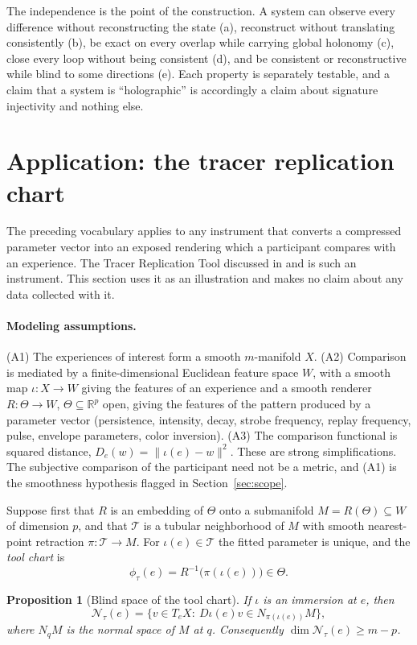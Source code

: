 \documentclass[11pt]{article}
\newtheorem{proposition}{Proposition}
\theoremstyle{remark}
\newcommand{\R}{\mathbb{R}}
\newcommand{\N}{\mathcal{N}}
\begin{document}
The independence is the point of the construction. A system can observe every difference without reconstructing the state (a), reconstruct without translating consistently (b), be exact on every overlap while carrying global holonomy (c), close every loop without being consistent (d), and be consistent or reconstructive while blind to some directions (e). Each property is separately testable, and a claim that a system is ``holographic'' is accordingly a claim about signature injectivity and nothing else.

\section{Application: the tracer replication chart}

The preceding vocabulary applies to any instrument that converts a compressed parameter vector into an exposed rendering which a participant compares with an experience. The Tracer Replication Tool discussed in \cite{flyxion} and \cite{qri_note} is such an instrument. This section uses it as an illustration and makes no claim about any data collected with it.

\paragraph{Modeling assumptions.} (A1) The experiences of interest form a smooth $m$-manifold $X$. (A2) Comparison is mediated by a finite-dimensional Euclidean feature space $W$, with a smooth map $\iota:X\to W$ giving the features of an experience and a smooth renderer $R:\Theta\to W$, $\Theta\subseteq\R^p$ open, giving the features of the pattern produced by a parameter vector (persistence, intensity, decay, strobe frequency, replay frequency, pulse, envelope parameters, color inversion). (A3) The comparison functional is squared distance, $D_e(w)=\|\iota(e)-w\|^2$. These are strong simplifications. The subjective comparison of the participant need not be a metric, and (A1) is the smoothness hypothesis flagged in Section~\ref{sec:scope}.

Suppose first that $R$ is an embedding of $\Theta$ onto a submanifold $M=R(\Theta)\subseteq W$ of dimension $p$, and that $\mathcal T$ is a tubular neighborhood of $M$ with smooth nearest-point retraction $\pi:\mathcal T\to M$. For $\iota(e)\in\mathcal T$ the fitted parameter is unique, and the \emph{tool chart} is
\[
\phi_\tau(e)=R^{-1}\bigl(\pi(\iota(e))\bigr)\in\Theta .
\]

\begin{proposition}[Blind space of the tool chart]\label{prop:toolblind}
If $\iota$ is an immersion at $e$, then
\[
\N_\tau(e)=\bigl\{v\in T_eX:\ D\iota(e)v\in N_{\pi(\iota(e))}M\bigr\},
\]
where $N_qM$ is the normal space of $M$ at $q$. Consequently $\dim\N_\tau(e)\ge m-p$.
\end{proposition}
\end{document}
